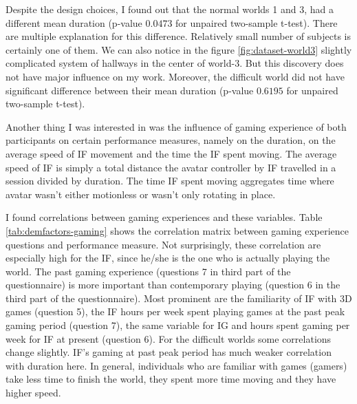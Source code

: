 Despite the design choices, I found out that the normal worlds 1 and 3, had a different mean duration (p-value $0.0473$ for unpaired two-sample t-test). There are multiple explanation for this difference. Relatively small number of subjects is certainly one of them. We can also notice in the figure \ref{fig:dataset-world3} slightly complicated system of hallways in the center of world-3. But this discovery does not have major influence on my work. Moreover, the difficult world did not have significant difference between their mean duration (p-value $0.6195$ for unpaired two-sample t-test).

Another thing I was interested in was the influence of gaming experience of both participants on certain performance measures, namely on the duration, on the average speed of IF movement and the time the IF spent moving. The average speed of IF is simply a total distance the avatar controller by IF travelled in a session divided by duration. The time IF spent moving aggregates time where avatar wasn't either motionless or wasn't only rotating in place. 

I found correlations between gaming experiences and these variables. Table \ref{tab:demfactors-gaming} shows the correlation matrix between gaming experience questions and performance measure.  Not surprisingly, these correlation are especially high for the IF, since he/she is the one who is actually playing the world. The past gaming experience (questions 7 in third part of the questionnaire) is more important than contemporary playing (question 6 in the third part of the questionnaire). Most prominent are the familiarity of IF with 3D games (question 5),  the IF hours per week spent playing games at the past peak gaming period (question 7), the same variable for IG and hours spent gaming per week for IF at present (question 6). For the difficult worlds some correlations change slightly. IF's gaming at past peak period has much weaker correlation with duration here. In general, individuals who are familiar with games (gamers) take less time to finish the world, they spent more time moving and they have higher speed.

